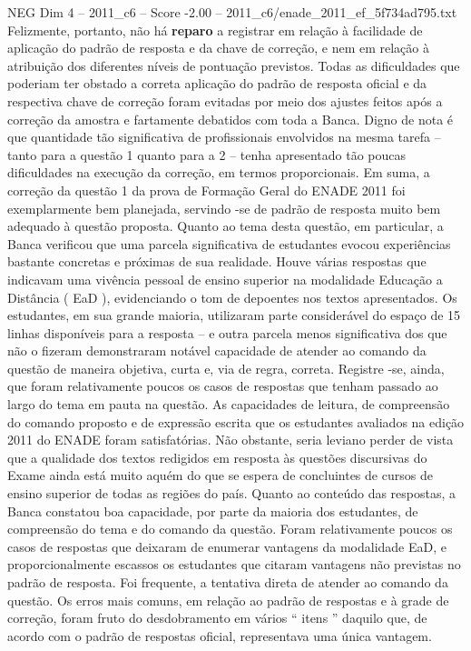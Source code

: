 \begin{textsample}{NEG Dim 4 – 2011\_c6 – Score -2.00 – 2011\_c6/enade\_2011\_ef\_5f734ad795.txt}
Felizmente, portanto, não há \textbf{reparo} a registrar em relação à facilidade de aplicação do padrão de resposta e da chave de correção, e nem em relação à atribuição dos diferentes níveis de pontuação previstos.
Todas as dificuldades que poderiam ter obstado a correta aplicação do padrão de resposta oficial e da respectiva chave de correção foram evitadas por meio dos ajustes feitos após a correção da amostra e fartamente debatidos com toda a Banca.
Digno de nota é que quantidade tão significativa de profissionais envolvidos na mesma tarefa – tanto para a questão 1 quanto para a 2 – tenha apresentado tão poucas dificuldades na execução da correção, em termos proporcionais.
Em suma, a correção da questão 1 da prova de Formação Geral do ENADE 2011 foi exemplarmente bem planejada, servindo -se de padrão de resposta muito bem adequado à questão proposta.
Quanto ao tema desta questão, em particular, a Banca verificou que uma parcela significativa de estudantes evocou experiências bastante concretas e próximas de sua realidade.
Houve várias respostas que indicavam uma vivência pessoal de ensino superior na modalidade Educação a Distância ( EaD ), evidenciando o tom de depoentes nos textos apresentados.
Os estudantes, em sua grande maioria, utilizaram parte considerável do espaço de 15 linhas disponíveis para a resposta – e outra parcela menos significativa dos que não o fizeram demonstraram notável capacidade de atender ao comando da questão de maneira objetiva, curta e, via de regra, correta.
Registre -se, ainda, que foram relativamente poucos os casos de respostas que tenham passado ao largo do tema em pauta na questão.
As capacidades de leitura, de compreensão do comando proposto e de expressão escrita que os estudantes avaliados na edição 2011 do ENADE foram satisfatórias.
Não obstante, seria leviano perder de vista que a qualidade dos textos redigidos em resposta às questões discursivas do Exame ainda está muito aquém do que se espera de concluintes de cursos de ensino superior de todas as regiões do país.
Quanto ao conteúdo das respostas, a Banca constatou boa capacidade, por parte da maioria dos estudantes, de compreensão do tema e do comando da questão.
Foram relativamente poucos os casos de respostas que deixaram de enumerar vantagens da modalidade EaD, e proporcionalmente escassos os estudantes que citaram vantagens não previstas no padrão de resposta.
Foi frequente, a tentativa direta de atender ao comando da questão.
Os erros mais comuns, em relação ao padrão de respostas e à grade de correção, foram fruto do desdobramento em vários “ itens ” daquilo que, de acordo com o padrão de respostas oficial, representava uma única vantagem.

\end{textsample}
